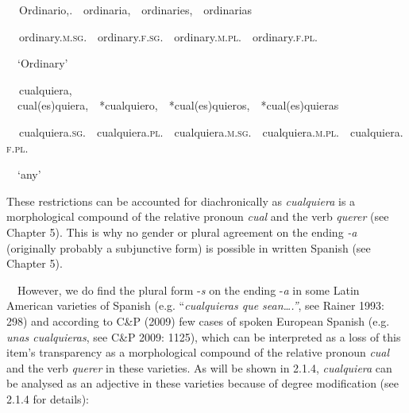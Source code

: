 \begin{styleStandard}
\textbf{\ \ }Ordinario,.\ \ ordinaria,\ \ ordinaries,\ \ ordinarias
\end{styleStandard}

\begin{styleStandard}
\textbf{\ \ }ordinary.\textsc{m.sg.}\ \ ordinary.\textsc{f.sg}.\ \ ordinary.\textsc{m.pl}.\ \ ordinary.\textsc{f.pl.}
\end{styleStandard}

\begin{styleStandard}
\ \ ‘Ordinary’
\end{styleStandard}

\begin{styleStandard}
\textbf{\ \ }cualquiera, \ \ cual(es)quiera,\ \ *cualquiero,\ \ *cual(es)quieros,\ \ *cual(es)quieras
\end{styleStandard}

\begin{styleStandard}
\textbf{\ \ }cualquiera.\textsc{sg}.\ \ cualquiera.\textsc{pl}.\ \ cualquiera.\textsc{m.sg}.\ \ cualquiera.\textsc{m.pl.}\ \ cualquiera.\textsc{f.pl.}
\end{styleStandard}

\begin{styleStandard}
\ \ ‘any’
\end{styleStandard}

\begin{styleStandard}
These restrictions can be accounted for diachronically as \textit{cualquiera} is a morphological compound of the relative pronoun \textit{cual} and the verb \textit{querer} (see Chapter 5). This is why no gender or plural agreement on the ending \textit{{}-a} (originally probably a subjunctive form) is possible in written Spanish (see Chapter 5).
\end{styleStandard}

\begin{styleStandard}
\ \ However, we do find the plural form -\textit{s} on the ending -\textit{a} in some Latin American varieties of Spanish (e.g. “\textit{cualquieras que sean….”}, see Rainer 1993: 298) and according to C\&P (2009) few cases of spoken European Spanish (e.g. \textit{unas cualquieras}, see C\&P 2009: 1125), which can be interpreted as a loss of this item’s transparency as a morphological compound of the relative pronoun \textit{cual} and the verb \textit{querer} in these varieties. As will be shown in 2.1.4, \textit{cualquiera} can be analysed as an adjective in these varieties because of degree modification (see 2.1.4 for details):
\end{styleStandard}

